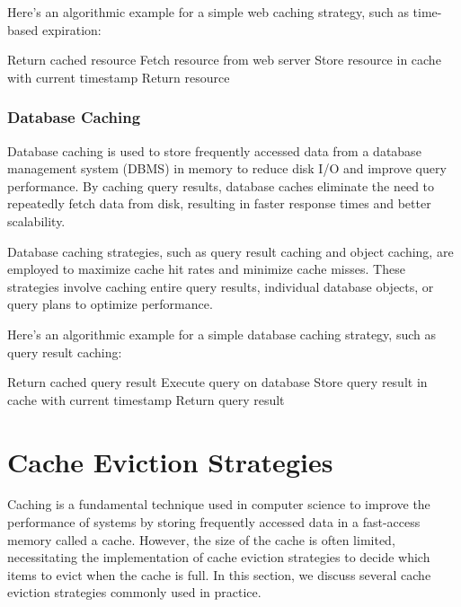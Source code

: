\documentclass[12pt]{book} %
\begin{document}
Here's an algorithmic example for a simple web caching strategy, such as time-based expiration:
\FloatBarrier
\begin{algorithm}[H]
\caption{Time-Based Expiration Web Caching}
\begin{algorithmic}[1]
    \State Return cached resource
\Else
    \State Fetch resource from web server
    \State Store resource in cache with current timestamp
    \State Return resource
\EndIf
\EndFunction
\end{algorithmic}
\end{algorithm}

\subsubsection{Database Caching}

Database caching is used to store frequently accessed data from a database management system (DBMS) in memory to reduce disk I/O and improve query performance. By caching query results, database caches eliminate the need to repeatedly fetch data from disk, resulting in faster response times and better scalability.

Database caching strategies, such as query result caching and object caching, are employed to maximize cache hit rates and minimize cache misses. These strategies involve caching entire query results, individual database objects, or query plans to optimize performance.

Here's an algorithmic example for a simple database caching strategy, such as query result caching:
\FloatBarrier
\begin{algorithm}[H]
\caption{Query Result Caching in Databases}
\begin{algorithmic}[1]
    \State Return cached query result
\Else
    \State Execute query on database
    \State Store query result in cache with current timestamp
    \State Return query result
\EndIf
\EndFunction
\end{algorithmic}
\end{algorithm}

\section{Cache Eviction Strategies}

Caching is a fundamental technique used in computer science to improve the performance of systems by storing frequently accessed data in a fast-access memory called a cache. However, the size of the cache is often limited, necessitating the implementation of cache eviction strategies to decide which items to evict when the cache is full. In this section, we discuss several cache eviction strategies commonly used in practice.
\end{document}
